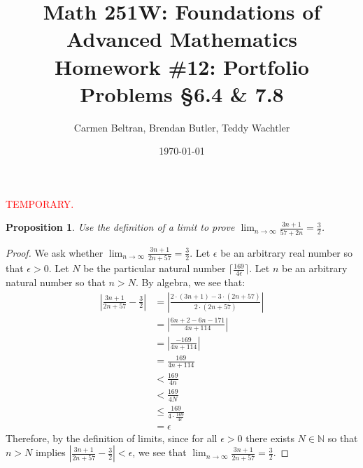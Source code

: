 \documentclass{amsart}
\newtheorem*{proposition}{Proposition}
\newcommand{\temp}{\textcolor{red}{TEMPORARY.} }
\newcommand{\limn}{\lim_{n \rightarrow \infty}}
\newcommand{\abs}[1]{\left|#1\right|}
\newcommand{\ceil}[1]{\lceil #1 \rceil}
\newcommand{\N}{\mathbb{N}}
\numberwithin{equation}{section}
\begin{document}
	\title[Math 251W: Homework \#12]{
		Math 251W: Foundations of Advanced Mathematics \\
		\textmd{Homework \#12: Portfolio Problems \S 6.4 \& 7.8}}
	\author{Carmen Beltran, Brendan Butler, Teddy Wachtler}
	\date{\today}

	\maketitle

	\begin{problem}[manual-num=70]
		\temp
		\begin{proposition}
			Use the definition of a limit to prove $\limn \frac{3n + 1}{57 + 2n} = \frac{3}{2}$.
		\end{proposition}

		\begin{proof}
			We ask whether $\limn \frac{3n + 1}{2n + 57} = \frac{3}{2}$.
			Let $\epsilon$ be an arbitrary real number so that $\epsilon > 0$.
			Let $N$ be the particular natural number $\ceil{\frac{169}{4 \epsilon}}$.
			Let $n$ be an arbitrary natural number so that $n > N$.
			By algebra, we see that:
			\begin{align*}
				\abs{\frac{3n + 1}{2n + 57} - \frac{3}{2}}
				&= \abs{\frac{2 \cdot (3n + 1) - 3 \cdot (2n + 57)}{2 \cdot (2n + 57)}} \\
				&= \abs{\frac{6n + 2 - 6n - 171}{4n + 114}} \\
				&= \abs{\frac{-169}{4n + 114}} \\
				&= \frac{169}{4n + 114} \\
				&< \frac{169}{4n} \\
				&< \frac{169}{4N} \\
				&\leq \frac{169}{4 \cdot \frac{169}{4 \epsilon}} \\
				&= \epsilon
			\end{align*}
			Therefore, by the definition of limits, since for all $\epsilon > 0$ there exists $N \in \N$ so that $n > N$ implies $\abs{\frac{3n + 1}{2n + 57} - \frac{3}{2}} < \epsilon$, we see that $\limn \frac{3n + 1}{2n + 57} = \frac{3}{2}$.
		\end{proof}
	\end{problem}
\end{document}
